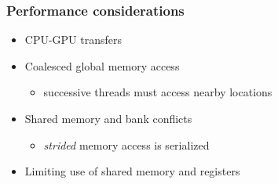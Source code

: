 \begin{frame}
\frametitle{Performance considerations}
\begin{itemize}
\item CPU-GPU transfers
\item Coalesced global memory access
    \begin{itemize}
        \item successive threads must access nearby locations
    \end{itemize}
\item Shared memory and bank conflicts
    \begin{itemize}
        \item \emph{strided} memory access is serialized
    \end{itemize}
\item Limiting use of shared memory and registers
\end{itemize}
\end{frame}


